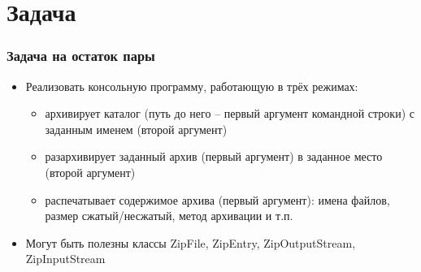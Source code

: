 \documentclass[xetex,mathserif,serif]{beamer}
\begin{document}
	\section{Задача}

	\begin{frame}
		\frametitle{Задача на остаток пары}
		\begin{itemize}
			\item Реализовать консольную программу, работающую в трёх режимах:
			\begin{itemize}
				\item архивирует каталог (путь до него -- первый аргумент командной строки) с заданным именем (второй аргумент)
				\item разархивирует заданный архив (первый аргумент) в заданное место (второй аргумент)
				\item распечатывает содержимое архива (первый аргумент): имена файлов, размер сжатый/несжатый, метод архивации и т.п.
			\end{itemize}
			\item Могут быть полезны классы ZipFile, ZipEntry, ZipOutputStream, ZipInputStream
		\end{itemize}
	\end{frame}
\end{document}
